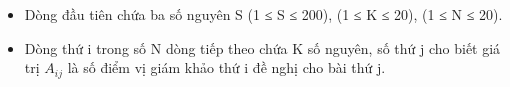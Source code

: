 \begin{itemize}
	\item Dòng đầu tiên chứa ba số nguyên S (1 ≤ S ≤ 200), (1 ≤ K ≤ 20), (1 ≤ N ≤ 20).
	\item Dòng thứ i trong số N dòng tiếp theo chứa K số nguyên, số thứ j cho biết giá trị $A_{ij}$ là số điểm vị giám khảo thứ i đề nghị cho bài thứ j.
\end{itemize}
